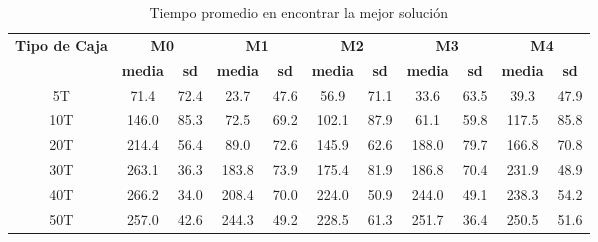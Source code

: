 \documentclass[openany]{article}
\begin{document}
\begin{table}[H]
    \centering
    \caption{Tiempo promedio en encontrar la mejor solución}
    \label{tab:tiempo}
    \begin{tabular}{|c|c|c|c|c|c|c|c|c|c|c|}
        \hline
        \multirow{2}{*}{\textbf{Tipo de Caja}} & \multicolumn{2}{c|}{\textbf{M0}} & \multicolumn{2}{c|}{\textbf{M1}} & \multicolumn{2}{c|}{\textbf{M2}} & \multicolumn{2}{c|}{\textbf{M3}} & \multicolumn{2}{c|}{\textbf{M4}}                                                                             \\ \cline{2-11}
                                               & \textbf{media}                   & \textbf{sd}                      & \textbf{media}                   & \textbf{sd}                      & \textbf{media}                   & \textbf{sd} & \textbf{media} & \textbf{sd} & \textbf{media} & \textbf{sd} \\ \hline
        5T                                     & 71.4                             & 72.4                             & 23.7                             & 47.6                             & 56.9                             & 71.1        & 33.6           & 63.5        & 39.3           & 47.9        \\ \hline
        10T                                    & 146.0                            & 85.3                             & 72.5                             & 69.2                             & 102.1                            & 87.9        & 61.1           & 59.8        & 117.5          & 85.8        \\ \hline
        20T                                    & 214.4                            & 56.4                             & 89.0                             & 72.6                             & 145.9                            & 62.6        & 188.0          & 79.7        & 166.8          & 70.8        \\ \hline
        30T                                    & 263.1                            & 36.3                             & 183.8                            & 73.9                             & 175.4                            & 81.9        & 186.8          & 70.4        & 231.9          & 48.9        \\ \hline
        40T                                    & 266.2                            & 34.0                             & 208.4                            & 70.0                             & 224.0                            & 50.9        & 244.0          & 49.1        & 238.3          & 54.2        \\ \hline
        50T                                    & 257.0                            & 42.6                             & 244.3                            & 49.2                             & 228.5                            & 61.3        & 251.7          & 36.4        & 250.5          & 51.6        \\ \hline
    \end{tabular}
\end{table}
\end{document}

